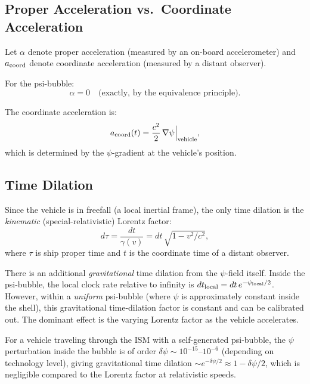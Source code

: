 \documentclass[aps,prd,twocolumn,superscriptaddress,nofootinbib]{revtex4-2}
\begin{document}
\subsection{Proper Acceleration vs.\ Coordinate Acceleration}

Let $\alpha$ denote proper acceleration (measured by an on-board
accelerometer) and $a_{\rm coord}$ denote coordinate acceleration
(measured by a distant observer).

For the psi-bubble:
\begin{equation}\label{eq:proper-accel}
\alpha = 0 \quad \text{(exactly, by the equivalence principle)}.
\end{equation}

The coordinate acceleration is:
\begin{equation}\label{eq:coord-accel}
a_{\rm coord}(t) = \frac{c^2}{2}\,\nabla\psi\Big|_{\text{vehicle}},
\end{equation}
which is determined by the $\psi$-gradient at the vehicle's position.

\subsection{Time Dilation}

Since the vehicle is in freefall (a local inertial frame), the only
time dilation is the \textit{kinematic} (special-relativistic) Lorentz
factor:
\begin{equation}\label{eq:time-dilation}
d\tau = \frac{dt}{\gamma(v)} = dt\,\sqrt{1 - v^2/c^2},
\end{equation}
where $\tau$ is ship proper time and $t$ is the coordinate time
of a distant observer.

There is an additional \textit{gravitational} time dilation from the
$\psi$-field itself.  Inside the psi-bubble, the local clock rate
relative to infinity is $dt_{\rm local} = dt\,e^{-\psi_{\rm local}/2}$.
However, within a \textit{uniform} psi-bubble (where $\psi$ is
approximately constant inside the shell), this gravitational
time-dilation factor is constant and can be calibrated out.  The
dominant effect is the varying Lorentz factor as the vehicle
accelerates.

For a vehicle traveling through the ISM with a self-generated
psi-bubble, the $\psi$ perturbation inside the bubble is of order
$\delta\psi \sim 10^{-15}$--$10^{-6}$ (depending on technology
level), giving gravitational time dilation $\sim e^{-\delta\psi/2}
\approx 1 - \delta\psi/2$, which is negligible compared to the
Lorentz factor at relativistic speeds.
\end{document}
